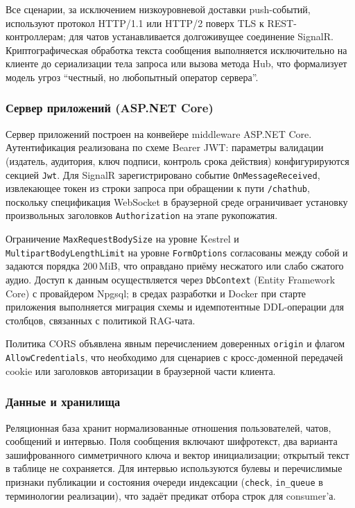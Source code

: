 \documentclass{article}
\begin{document}
Все сценарии, за исключением низкоуровневой доставки push-событий, используют протокол HTTP/1.1 или HTTP/2 поверх TLS к REST-контроллерам; для чатов устанавливается долгоживущее соединение SignalR. Криптографическая обработка текста сообщения выполняется исключительно на клиенте до сериализации тела запроса или вызова метода Hub, что формализует модель угроз ``честный, но любопытный оператор сервера''.

\subsubsection{Сервер приложений (ASP.NET Core)}

Сервер приложений построен на конвейере middleware ASP.NET Core. Аутентификация реализована по схеме Bearer JWT: параметры валидации (издатель, аудитория, ключ подписи, контроль срока действия) конфигурируются секцией \texttt{Jwt}. Для SignalR зарегистрировано событие \texttt{OnMessageReceived}, извлекающее токен из строки запроса при обращении к пути \texttt{/chathub}, поскольку спецификация WebSocket в браузерной среде ограничивает установку произвольных заголовков \texttt{Authorization} на этапе рукопожатия.

Ограничение \texttt{MaxRequestBodySize} на уровне Kestrel и \texttt{MultipartBodyLengthLimit} на уровне \texttt{FormOptions} согласованы между собой и задаются порядка $200\,\mathrm{MiB}$, что оправдано приёму несжатого или слабо сжатого аудио. Доступ к данным осуществляется через \texttt{DbContext} (Entity Framework Core) с провайдером Npgsql; в средах разработки и Docker при старте приложения выполняется миграция схемы и идемпотентные DDL-операции для столбцов, связанных с политикой RAG-чата.

Политика CORS объявлена явным перечислением доверенных \texttt{origin} и флагом \texttt{AllowCredentials}, что необходимо для сценариев с кросс-доменной передачей cookie или заголовков авторизации в браузерной части клиента.

\subsubsection{Данные и хранилища}

Реляционная база хранит нормализованные отношения пользователей, чатов, сообщений и интервью. Поля сообщения включают шифротекст, два варианта зашифрованного симметричного ключа и вектор инициализации; открытый текст в таблице не сохраняется. Для интервью используются булевы и перечислимые признаки публикации и состояния очереди индексации (\texttt{check}, \texttt{in\_queue} в терминологии реализации), что задаёт предикат отбора строк для consumer'а.
\end{document}
